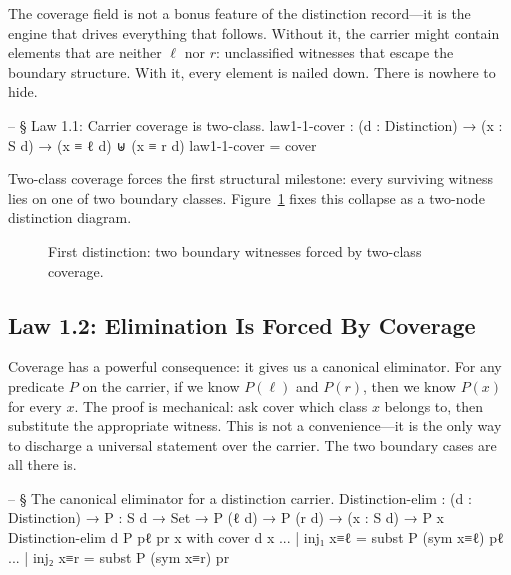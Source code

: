\documentclass[11pt,a4paper]{book}
\def\texttt#1{#1}%
\begin{document}
The coverage field is not a bonus feature of the distinction record—it is the engine that drives everything that follows. Without it, the carrier might contain elements that are neither $\ell$ nor $r$: unclassified witnesses that escape the boundary structure. With it, every element is nailed down. There is nowhere to hide.

\begin{code}
-- § Law 1.1: Carrier coverage is two-class.
law1-1-cover : (d : Distinction) → (x : S d) → (x ≡ ℓ d) ⊎ (x ≡ r d)
law1-1-cover = cover
\end{code}

Two-class coverage forces the first structural milestone: every surviving witness lies on one of two boundary classes. Figure~\ref{fig:first-distinction} fixes this collapse as a two-node distinction diagram.

\begin{figure}[h]
\centering
{}
\caption{First distinction: two boundary witnesses forced by two-class coverage.}
\label{fig:first-distinction}
\end{figure}

\subsection{Law 1.2: Elimination Is Forced By Coverage}

Coverage has a powerful consequence: it gives us a canonical eliminator. For any predicate $P$ on the carrier, if we know $P(\ell)$ and $P(r)$, then we know $P(x)$ for every $x$. The proof is mechanical: ask \texttt{cover} which class $x$ belongs to, then substitute the appropriate witness. This is not a convenience—it is the only way to discharge a universal statement over the carrier. The two boundary cases are all there is.

\begin{code}
-- § The canonical eliminator for a distinction carrier.
Distinction-elim :
  (d : Distinction) →
  {P : S d → Set} →
  P (ℓ d) →
  P (r d) →
  (x : S d) →
  P x
Distinction-elim d {P} pℓ pr x with cover d x
... | inj₁ x≡ℓ = subst P (sym x≡ℓ) pℓ
... | inj₂ x≡r = subst P (sym x≡r) pr
\end{code}
\end{document}
